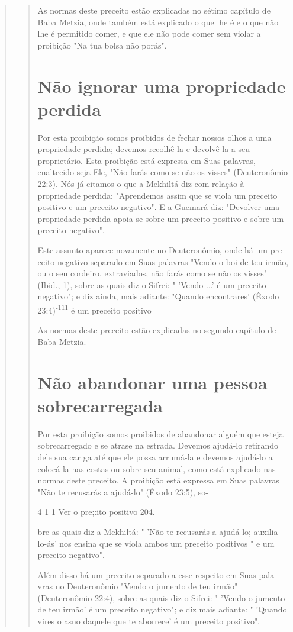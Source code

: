 \begin{quote}
\begin{quote}
As normas deste preceito estão explicadas no sétimo capítulo de Baba
Metzia, onde também está explicado o que lhe é e o que não lhe é
permitido comer, e que ele não pode comer sem violar a proibição "Na tua
bolsa não porás".

\section{Não ignorar uma propriedade perdida}

Por esta proibição somos proibidos de fechar nossos olhos a uma
propriedade perdida; devemos recolhê-la e devolvê-la a seu proprietário.
Esta proibição está expressa em Suas palavras, enaltecido seja Ele, "Não
farás co­mo se não os visses" (Deuteronômio 22:3). Nós já citamos o que
a Mekhiltá diz com relação à propriedade perdida: "Aprendemos assim que
se viola um preceito positivo e um preceito negativo". E a Guemará diz:
"Devolver uma propriedade perdida apoia-se sobre um preceito positivo e
sobre um preceito negativo".

Este assunto aparece novamente no Deuteronômio, onde há um pre­ceito
negativo separado em Suas palavras "Vendo o boi de teu irmão, ou o seu
cordeiro, extraviados, não farás como se não os visses" (Ibid., 1),
sobre as quais diz o Sifrei: " 'Vendo ...' é um preceito negativo"; e
diz ainda, mais adiante: "Quando encontrares' (Êxodo
23:4)\textsuperscript{-111} é um preceito positivo

As normas deste preceito estão explicadas no segundo capítulo de Baba
Metzia.

\section{Não abandonar uma pessoa sobrecarregada}

Por esta proibição somos proibidos de abandonar alguém que esteja
sobrecarregado e se atrase na estrada. Devemos ajudá-lo retirando dele
sua car ga até que ele possa arrumá-la e devemos ajudá-lo a colocá-la
nas costas ou so­bre seu animal, como está explicado nas normas deste
preceito. A proibição está expressa em Suas palavras "Não te recusarás a
ajudá-lo" (Êxodo 23:5), so-

4 1 1 Ver o pre;:ito positivo 204.

bre as quais diz a Mekhiltá: " 'Não te recusarás a ajudá-lo;
auxilia-lo-ás' nos en­sina que se viola ambos um preceito positivos " e
um preceito negativo".

Além disso há um preceito separado a esse respeito em Suas pala­vras no
Deuteronômio "Vendo o jumento de teu irmão" (Deuteronômio 22:4), sobre
as quais diz o Sifrei: " 'Vendo o jumento de teu irmão' é um preceito
negativo"; e diz mais adiante: " 'Quando vires o asno daquele que te
aborrece' é um preceito positivo".


\end{quote}
\end{quote}
